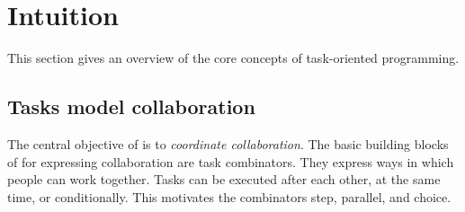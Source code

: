 


\section{Intuition}
\label{sec:intuition}

This section gives an overview of the core concepts of task-oriented programming.



\subsection{Tasks model collaboration}

The central objective of \TOP is to \emph{coordinate collaboration}.
The basic building blocks of \TOPHAT for expressing collaboration are task combinators.
They express ways in which people can work together.
Tasks can be executed after each other, at the same time, or conditionally.
This motivates the combinators step, parallel, and choice.

